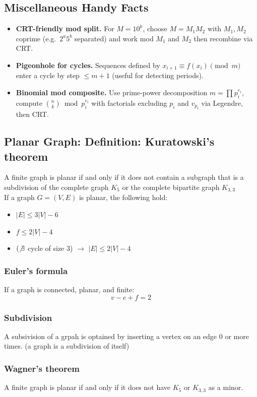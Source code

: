 \documentclass[10pt]{article}
\theoremstyle{definition}
\begin{document}
\subsection{Miscellaneous Handy Facts}
\begin{itemize}
  \item \textbf{CRT-friendly mod split.} For $M=10^k$, choose $M=M_1M_2$ with $M_1,M_2$ coprime (e.g.\ $2^a5^b$ separated) and work mod $M_1$ and $M_2$ then recombine via CRT.
  \item \textbf{Pigeonhole for cycles.} Sequences defined by $x_{i+1}\equiv f(x_i)\pmod m$ enter a cycle by step $\le m+1$ (useful for detecting periods).
  \item \textbf{Binomial mod composite.} Use prime-power decomposition $m=\prod p_i^{e_i}$, compute $\binom{n}{k}\bmod p_i^{e_i}$ with factorials excluding $p_i$ and $v_{p_i}$ via Legendre, then CRT.
\end{itemize}


\subsection{Planar Graph: Definition: Kuratowski's theorem}
A finite graph is planar if and only if it does not contain a subgraph that is a subdivision of the complete graph $K_5$ or the complete bipartite graph $K_{3, 3}$\\
If a graph $G = (V, E)$ is planar, the following hold:
\begin{itemize}
  \item $|E| \leq 3|V| - 6$
  \item $f \leq 2 |V| - 4$
  \item $(\not\exists$ cycle of size 3) $\rightarrow$ $|E| \leq 2|V| -4 $
\end{itemize}
\subsubsection*{Euler's formula}
If a graph is connected, planar, and finite:
\[v - e + f = 2\]
\subsubsection*{Subdivision}
A subsivision of a grpah is optained by inserting a vertex on an edge 0 or more times. (a graph is a subdivision of itself)
\subsubsection*{Wagner's theorem}
A finite graph is planar if and only if it does not have $K_5$ or $K_{3,3}$ as a minor.
\end{document}
